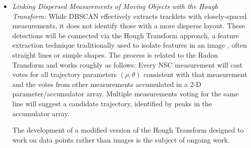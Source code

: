\documentclass[twocolumn]{aastex62}
\begin{document}
\begin{itemize}
\item \textit{Linking Dispersed Measurements of Moving Objects with the Hough Transform:} 
While DBSCAN effectively extracts tracklets with closely-spaced measurements, it does not identify those with a more disperse layout.  These detections will be connected via the Hough Transform approach, a feature extraction technique traditionally used to isolate features in an image \citep{Duda1972}, often straight lines or simple shapes.  The process is related to the Radon Transform \citep{Radon17} and works roughly as follows: Every NSC measurement will cast votes for all trajectory parameters $(\rho,\theta)$ consistent with that measurement and the votes from other measurements accumulated in a 2-D parameter/accumulator array.  Multiple measurements voting for the same line will suggest a candidate trajectory, identified by peaks in the accumulator array. 




The development of a modified version of the Hough Transform designed to work on data points rather than images is the subject of ongoing work.


\end{itemize}
\end{document}
